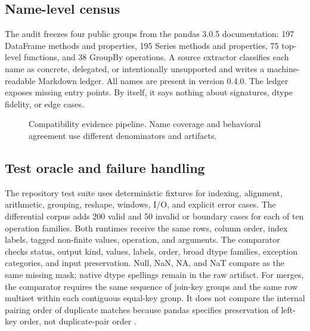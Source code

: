\documentclass[pdflatex,sn-basic,Numbered]{sn-jnl}
\begin{document}
\subsection{Name-level census}

The audit freezes four public groups from the pandas 3.0.5 documentation: 197 DataFrame methods and properties, 195 Series methods and properties, 75 top-level functions, and 38 GroupBy operations. A source extractor classifies each name as concrete, delegated, or intentionally unsupported and writes a machine-readable Markdown ledger. All \ApiCount{} names are present in version 0.4.0. The ledger exposes missing entry points. By itself, it says nothing about signatures, dtype fidelity, or edge cases.

\begin{figure}[t]
\centering
{}
\caption{Compatibility evidence pipeline. Name coverage and behavioral agreement use different denominators and artifacts.}\label{fig:conformance}
\end{figure}

\subsection{Test oracle and failure handling}

The repository test suite uses deterministic fixtures for indexing, alignment, arithmetic, grouping, reshape, windows, I/O, and explicit error cases. The differential corpus adds 200 valid and 50 invalid or boundary cases for each of ten operation families. Both runtimes receive the same rows, column order, index labels, tagged non-finite values, operation, and arguments. The comparator checks status, output kind, values, labels, order, broad dtype families, exception categories, and input preservation. Null, NaN, NA, and NaT compare as the same missing mask; native dtype spellings remain in the raw artifact. For merges, the comparator requires the same sequence of join-key groups and the same row multiset within each contiguous equal-key group. It does not compare the internal pairing order of duplicate matches because pandas specifies preservation of left-key order, not duplicate-pair order \cite{pandas305}.
\end{document}
